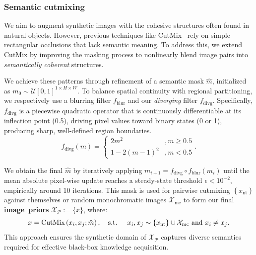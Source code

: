 \subsubsection{Semantic cutmixing} \label{ch4:sssec:03-framework-synthesis-semcutmix}
\begin{foldable} %
    We aim to augment synthetic images with the cohesive structures often found in natural objects.
    However, previous techniques like CutMix~\cite{yun2019cutmix} rely on simple rectangular occlusions that lack semantic meaning.
    To address this, we extend CutMix by improving the masking process to nonlinearly blend image pairs into \textit{semantically coherent} structures.
\end{foldable}

\begin{foldable} %
    We achieve these patterns through refinement of a semantic mask $\hat{m}$, initialized as $m_{0} \sim \mathcal{U}\left[0,1\right]^{1 \times H \times W}$.
    To balance spatial continuity with regional partitioning, we respectively use a blurring filter $f_{\text{blur}}$ and our \textit{diverging} filter $f_{\text{divg}}$.
    Specifically, $f_{\text{divg}}$ is a piecewise quadratic operator that is continuously differentiable at its inflection point (0.5), driving pixel values toward binary states (0 or 1), producing sharp, well-defined region boundaries.
    \begin{equation} \label{ch4:eq:synthesis-diverging-filter}
        f_{\text{divg}}\left(m\right)=\begin{cases}
            2 m^{2}           & , m \ge 0.5 \\
            1 - 2 (m - 1)^{2} & , m < 0.5
        \end{cases}.
    \end{equation}
\end{foldable}

\begin{foldable} %
    We obtain the final $\hat{m}$ by iteratively applying $m_{i+1}=f_{\text{divg}} \circ f_{\text{blur}}\left(m_{i}\right)$ until the mean absolute pixel-wise update reaches a steady-state threshold $\epsilon < 10^{-2}$, empirically around 10 iterations.
    This mask is used for pairwise cutmixing $\left\{ x_{\text{nt}}\right\}$ against themselves or random monochromatic images $\mathcal{X}_{\text{mc}}$ to form our final \textbf{image~priors} $\mathcal{X}_\mathcal{P} := \{x\}$, where:
    \begin{equation} \label{ch4:eq:synthesis-semcutmix}
        x=\text{CutMix}\left(x_{i},x_{j};\hat{m}\right), \text{\quad s.t. \quad} x_{i},x_{j} \sim \left\{ x_{\text{nt}}\right\} \cup \mathcal{X}_{\text{\text{mc}}} \text{ and } x_{i} \ne x_{j}.
    \end{equation}
    This approach ensures the synthetic domain of $\mathcal{X}_\mathcal{P}$ captures diverse semantics required for effective black-box knowledge acquisition.
\end{foldable}



